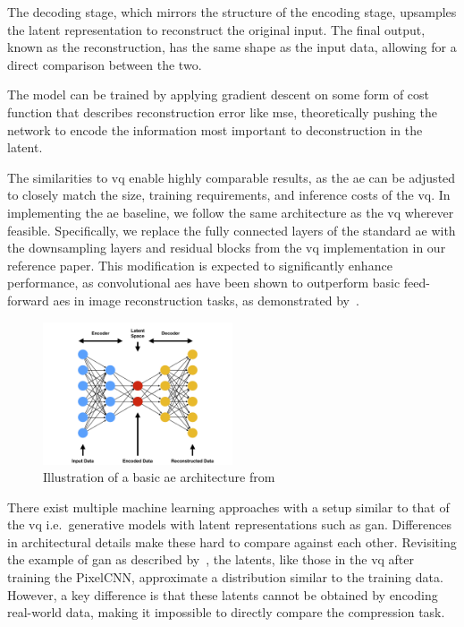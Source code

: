 The decoding stage, which mirrors the structure of the encoding stage, upsamples the latent representation to reconstruct the original input.
The final output, known as the reconstruction, has the same shape as the input data, allowing for a direct comparison between the two.

The model can be trained by applying gradient descent on some form of cost function that describes reconstruction error
like \ac{mse}, theoretically pushing the network to encode the information most important to deconstruction in the
latent.

The similarities to \ac{vq} enable highly comparable results, as the \ac{ae} can be adjusted to closely match the
size, training requirements, and inference costs of the \ac{vq}.
In implementing the \ac{ae} baseline, we follow the same architecture as the \ac{vq} wherever feasible.
Specifically, we replace the fully connected layers of the standard \ac{ae} with the downsampling layers and
residual blocks from the \ac{vq} implementation in our reference paper.
This modification is expected to significantly enhance performance, as convolutional \ac{ae}s have been shown to
outperform basic feed-forward \ac{ae}s in image reconstruction tasks, as demonstrated by~\cite{convae}.

\begin{figure}[H]
    \centering
    \includegraphics[width=0.5\textwidth]{images/ae}
    \caption{Illustration of a basic \ac{ae} architecture from~\cite{ae_pic}}
    \label{fig:ae}
\end{figure}

There exist multiple machine learning approaches with a setup similar to that of the \ac{vq}
i.e.\ generative models with latent representations such as \ac{gan}.
Differences in architectural details make these hard to compare against each other.
Revisiting the example of \ac{gan} as described by~\cite{gan}, the latents, like those in the \ac{vq} after
training the PixelCNN, approximate a distribution similar to the training data.
However, a key difference is that these latents cannot be obtained by encoding real-world data, making it impossible to
directly compare the compression task.

